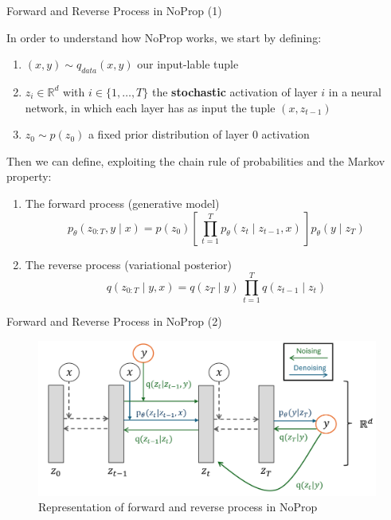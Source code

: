 \documentclass{beamer}
\begin{document}
\begin{frame}{Forward and Reverse Process in NoProp (1)}

In order to understand how NoProp works, we start by defining:
 \begin{enumerate}
\item $(x, y) \sim q_{data}(x, y)$ our input-lable tuple

\item $z_i \in \mathbb{R}^d$ with $i \in \{1, \dots, T\}$ the \textbf{stochastic} activation of layer $i$ in a neural network, in which each layer has as input the tuple $(x, z_{t-1})$ 
\item $z_0 \sim p(z_0)$ a fixed prior distribution of layer 0 activation
        \end{enumerate}

\medskip

Then we can define, exploiting the chain rule of probabilities and the Markov property: 

 \begin{enumerate}
\item The forward process (generative model)
\[
p_\theta(z_{0:T}, y \mid x)
=
p(z_0) [\, \prod_{t=1}^T p_\theta(z_t \mid z_{t-1}, x) \,] p_\theta(y \mid z_T)
\]

\item The reverse process (variational posterior)
\[
q(z_{0:T} \mid y, x)
=
q(z_T \mid y) \, \prod_{t=1}^T q(z_{t-1} \mid z_t)
\]

        \end{enumerate}


\end{frame}


\begin{frame}{Forward and Reverse Process in NoProp (2)}


\begin{figure}
    \centering
    \includegraphics[width=\linewidth]{prob.png}
    \caption{Representation of forward and reverse process in NoProp}
    \label{fig:placeholder}
\end{figure}



\end{frame}
\end{document}

